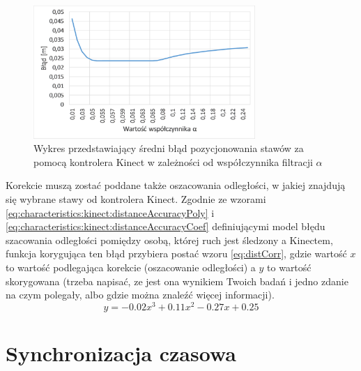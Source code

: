 \begin{figure}[!htb]
	\centering 
	\includegraphics[width=0.75\textwidth]{images/kinectPosErrorAlpha.png}
	\caption{Wykres przedstawiający średni błąd pozycjonowania stawów za pomocą kontrolera Kinect w zależności od współczynnika filtracji $\alpha$}
	\label{fig:hybrid:kinect:lpf}
\end{figure}

Korekcie muszą zostać poddane także oszacowania odległości, w jakiej znajdują się wybrane stawy od kontrolera Kinect. Zgodnie ze wzorami \eqref{eq:characteristics:kinect:distanceAccuracyPoly} i \eqref{eq:characteristics:kinect:distanceAccuracyCoef} definiującymi model błędu szacowania odległości pomiędzy osobą, której ruch jest śledzony a Kinectem, funkcja korygująca ten błąd przybiera postać wzoru \eqref{eq:distCorr}, gdzie wartość $x$ to wartość podlegająca korekcie (oszacowanie odległości) a $y$ to wartość skorygowana (trzeba napisać, ze jest ona wynikiem Twoich badań i jedno zdanie na czym polegały, albo gdzie można znaleźć więcej informacji).
\begin{equation}
y = -0.02x^3 + 0.11x^2 - 0.27x + 0.25
\label{eq:distCorr}
\end{equation}
 

\section{Synchronizacja czasowa}

